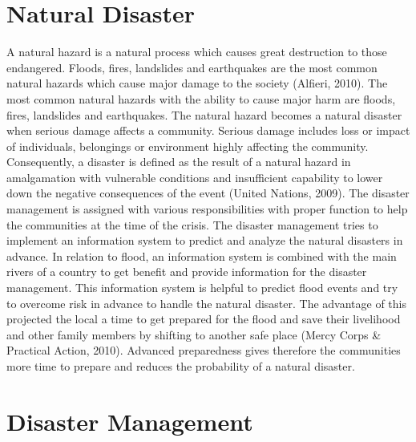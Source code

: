 
\section{Natural Disaster}\label{sec:natural_disaster}

A natural hazard  is a natural process  which causes great destruction to those endangered.  Floods, fires, landslides and earthquakes are the most common natural hazards which cause major damage to the society (Alfieri, 2010). The most common natural hazards with the ability to cause major harm are floods, fires, landslides and earthquakes. The natural hazard becomes a natural disaster when serious damage affects a community. Serious damage includes loss or impact of individuals, belongings or environment highly affecting the community. Consequently, a disaster  is defined as the result of a natural hazard in amalgamation with vulnerable conditions and insufficient capability to lower down the negative consequences of the event (United Nations, 2009).
 The disaster management is assigned with various responsibilities with proper function to  help the communities at the time of the crisis. The disaster management  tries to implement an information system to predict and analyze the natural disasters in advance. In relation to flood, an information system is combined  with the  main rivers of a country to get benefit and provide information for the disaster management. This information system is helpful to predict flood events  and try to overcome risk in advance to handle the natural disaster. The advantage of this projected the local a time  to get prepared for the flood and save their livelihood  and other family members by shifting to another safe place (Mercy Corps & Practical Action, 2010). Advanced preparedness gives therefore the communities more time to prepare and reduces the probability of a natural disaster.


\section{Disaster Management}\label{sec:disaster_management}

